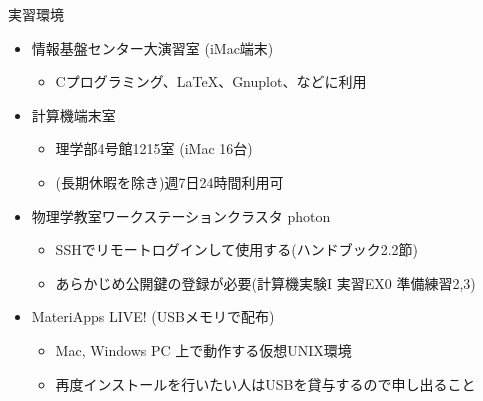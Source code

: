 \begin{frame}[t,fragile]{実習環境}
  \begin{itemize}
    \setlength{\itemsep}{1em}
  \item 情報基盤センター大演習室 (iMac端末)
    \begin{itemize}
    \item Cプログラミング、\LaTeX、Gnuplot、などに利用
    \end{itemize}
  \item 計算機端末室
    \begin{itemize}
    \item 理学部4号館1215室 (iMac 16台)
    \item {\color{red}(長期休暇を除き)週7日24時間利用可}
    \end{itemize}
  \item 物理学教室ワークステーションクラスタ photon
    \begin{itemize}
    \item SSHでリモートログインして使用する(ハンドブック2.2節)
    \item あらかじめ公開鍵の登録が必要(計算機実験I 実習EX0 準備練習2,3)
    \end{itemize}
  \item MateriApps LIVE! (USBメモリで配布)
    \begin{itemize}
    \item Mac, Windows PC 上で動作する仮想UNIX環境
    \item 再度インストールを行いたい人はUSBを貸与するので申し出ること
    \end{itemize}
  \end{itemize}
\end{frame}
